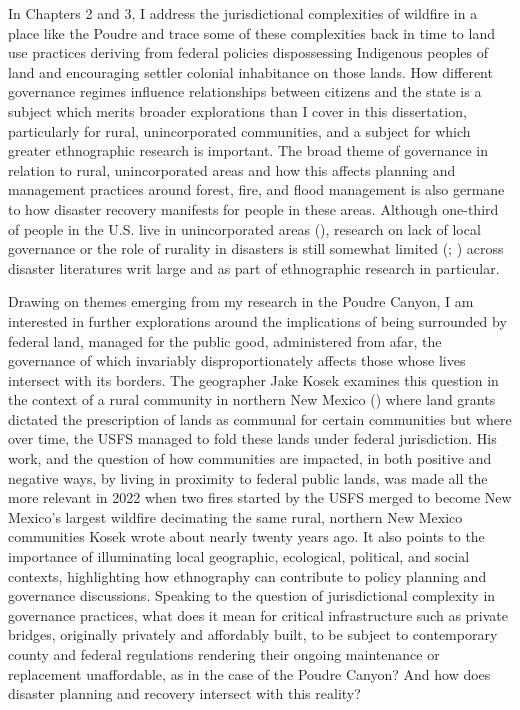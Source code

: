 \documentclass[
]{article}
\begin{document}
In Chapters 2 and 3, I address the jurisdictional complexities of wildfire in a place like the Poudre and trace some of these complexities back in time to land use practices deriving from federal policies dispossessing Indigenous peoples of land and encouraging settler colonial inhabitance on those lands. How different governance regimes influence relationships between citizens and the state is a subject which merits broader explorations than I cover in this dissertation, particularly for rural, unincorporated communities, and a subject for which greater ethnographic research is important. The broad theme of governance in relation to rural, unincorporated areas and how this affects planning and management practices around forest, fire, and flood management is also germane to how disaster recovery manifests for people in these areas. Although one-third of people in the U.S. live in unincorporated areas (), research on lack of local governance or the role of rurality in disasters is still somewhat limited (; ) across disaster literatures writ large and as part of ethnographic research in particular.

Drawing on themes emerging from my research in the Poudre Canyon, I am interested in further explorations around the implications of being surrounded by federal land, managed for the public good, administered from afar, the governance of which invariably disproportionately affects those whose lives intersect with its borders. The geographer Jake Kosek examines this question in the context of a rural community in northern New Mexico () where land grants dictated the prescription of lands as communal for certain communities but where over time, the USFS managed to fold these lands under federal jurisdiction. His work, and the question of how communities are impacted, in both positive and negative ways, by living in proximity to federal public lands, was made all the more relevant in 2022 when two fires started by the USFS merged to become New Mexico's largest wildfire decimating the same rural, northern New Mexico communities Kosek wrote about nearly twenty years ago. It also points to the importance of illuminating local geographic, ecological, political, and social contexts, highlighting how ethnography can contribute to policy planning and governance discussions. Speaking to the question of jurisdictional complexity in governance practices, what does it mean for critical infrastructure such as private bridges, originally privately and affordably built, to be subject to contemporary county and federal regulations rendering their ongoing maintenance or replacement unaffordable, as in the case of the Poudre Canyon? And how does disaster planning and recovery intersect with this reality?
\end{document}
